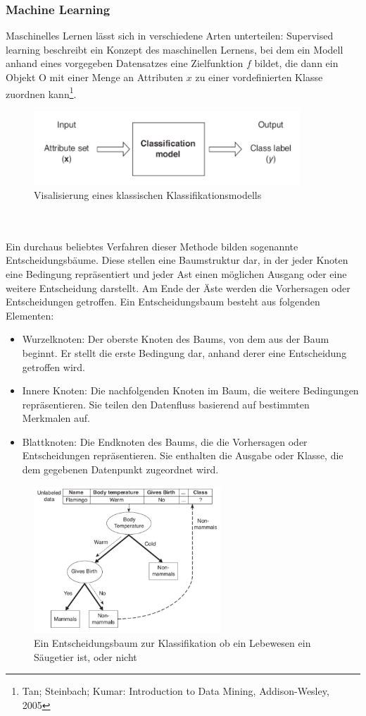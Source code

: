 \documentclass[11pt,a4paper]{article}
\begin{document}
\subsubsection{Machine Learning}
Maschinelles Lernen lässt sich in verschiedene Arten unterteilen:
Supervised learning beschreibt ein Konzept des maschinellen Lernens, bei dem ein Modell anhand eines vorgegeben Datensatzes eine Zielfunktion $f$ bildet, die dann ein Objekt O mit einer Menge an Attributen $x$ zu einer vordefinierten Klasse zuordnen kann\footnote{Tan; Steinbach; Kumar: Introduction to Data Mining, Addison-Wesley, 2005}.
\begin{figure}[h]
\includegraphics[width=100mm,scale=1, center]{entscheidungsbaum_diagramm.png}
\caption{Visalisierung eines klassischen Klassifikationsmodells}
\label{fig:figure1}
\end{figure}
\\\\Ein durchaus beliebtes Verfahren dieser Methode bilden sogenannte Entscheidungsbäume. 
Diese stellen eine Baumstruktur dar, in der jeder Knoten eine Bedingung repräsentiert und jeder Ast einen möglichen Ausgang oder eine weitere Entscheidung darstellt. Am Ende der Äste werden die Vorhersagen oder Entscheidungen getroffen.
Ein Entscheidungsbaum besteht aus folgenden Elementen:
\begin{itemize}

\item Wurzelknoten: Der oberste Knoten des Baums, von dem aus der Baum beginnt. Er stellt die erste Bedingung dar, anhand derer eine Entscheidung getroffen wird.
\item Innere Knoten: Die nachfolgenden Knoten im Baum, die weitere Bedingungen repräsentieren. Sie teilen den Datenfluss basierend auf bestimmten Merkmalen auf.
\item Blattknoten: Die Endknoten des Baums, die die Vorhersagen oder Entscheidungen repräsentieren. Sie enthalten die Ausgabe oder Klasse, die dem gegebenen Datenpunkt zugeordnet wird.
\end{itemize}
\begin{figure}[h!]
\includegraphics[width=70mm, scale=0.3, center]{entscheidungsbaum.png}
\caption{Ein Entscheidungsbaum zur Klassifikation ob ein Lebewesen ein Säugetier ist, oder nicht}
\label{fig:figure2}
\end{figure}
\end{document}
